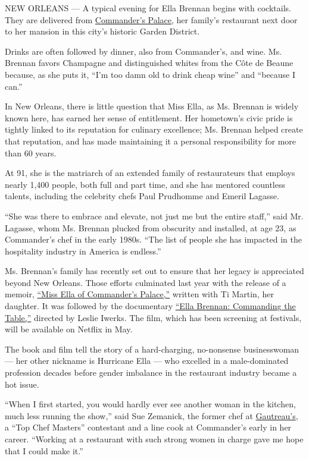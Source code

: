 NEW ORLEANS --- A typical evening for Ella Brennan begins with
cocktails. They are delivered from
\href{http://www.commanderspalace.com/}{Commander's Palace}, her
family's restaurant next door to her mansion in this city's historic
Garden District.

Drinks are often followed by dinner, also from Commander's, and wine.
Ms. Brennan favors Champagne and distinguished whites from the Côte de
Beaune because, as she puts it, ``I'm too damn old to drink cheap wine''
and ``because I can.''

In New Orleans, there is little question that Miss Ella, as Ms. Brennan
is widely known here, has earned her sense of entitlement. Her
hometown's civic pride is tightly linked to its reputation for culinary
excellence; Ms. Brennan helped create that reputation, and has made
maintaining it a personal responsibility for more than 60 years.

At 91, she is the matriarch of an extended family of restaurateurs that
employs nearly 1,400 people, both full and part time, and she has
mentored countless talents, including the celebrity chefs Paul Prudhomme
and Emeril Lagasse.

``She was there to embrace and elevate, not just me but the entire
staff,'' said Mr. Lagasse, whom Ms. Brennan plucked from obscurity and
installed, at age 23, as Commander's chef in the early 1980s. ``The list
of people she has impacted in the hospitality industry in America is
endless.''

Ms. Brennan's family has recently set out to ensure that her legacy is
appreciated beyond New Orleans. Those efforts culminated last year with
the release of a memoir,
\href{http://www.gibbs-smith.com/Miss-Ella-of-Commanders-Palace-P1943.aspx}{``Miss
Ella of Commander's Palace,''} written with Ti Martin, her daughter. It
was followed by the documentary
\href{http://www.ellabrennanmovie.com/}{``Ella Brennan: Commanding the
Table,''} directed by Leslie Iwerks. The film, which has been screening
at festivals, will be available on Netflix in May.

The book and film tell the story of a hard-charging, no-nonsense
businesswoman --- her other nickname is Hurricane Ella --- who excelled
in a male-dominated profession decades before gender imbalance in the
restaurant industry became a hot issue.

``When I first started, you would hardly ever see another woman in the
kitchen, much less running the show,'' said Sue Zemanick, the former
chef at \href{http://www.gautreausrestaurant.com/}{Gautreau's}, a ``Top
Chef Masters'' contestant and a line cook at Commander's early in her
career. ``Working at a restaurant with such strong women in charge gave
me hope that I could make it.''

